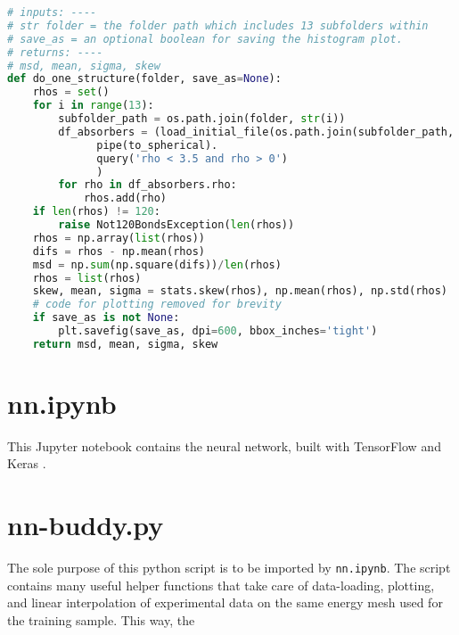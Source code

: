 \begin{lstlisting}[language=Python]
# inputs: ----
# str folder = the folder path which includes 13 subfolders within
# save_as = an optional boolean for saving the histogram plot.
# returns: ----
# msd, mean, sigma, skew
def do_one_structure(folder, save_as=None):
    rhos = set()
    for i in range(13):
        subfolder_path = os.path.join(folder, str(i))
        df_absorbers = (load_initial_file(os.path.join(subfolder_path, 'feff.inp')).
              pipe(to_spherical).
              query('rho < 3.5 and rho > 0')
              )
        for rho in df_absorbers.rho:
            rhos.add(rho)
    if len(rhos) != 120:
        raise Not120BondsException(len(rhos))
    rhos = np.array(list(rhos))
    difs = rhos - np.mean(rhos)
    msd = np.sum(np.square(difs))/len(rhos)
    rhos = list(rhos)
    skew, mean, sigma = stats.skew(rhos), np.mean(rhos), np.std(rhos)
    # code for plotting removed for brevity
    if save_as is not None:
        plt.savefig(save_as, dpi=600, bbox_inches='tight')
    return msd, mean, sigma, skew
\end{lstlisting}


\section{nn.ipynb}
This Jupyter notebook contains the neural network, built with TensorFlow \cite{tensorflow2015-whitepaper} and Keras \cite{keras2015}.

\section{nn-buddy.py}
The sole purpose of this python script is to be imported by \texttt{nn.ipynb}. The script contains many useful helper functions that take care of data-loading, plotting, and linear interpolation of experimental data on the same energy mesh used for the training sample. This way, the 
